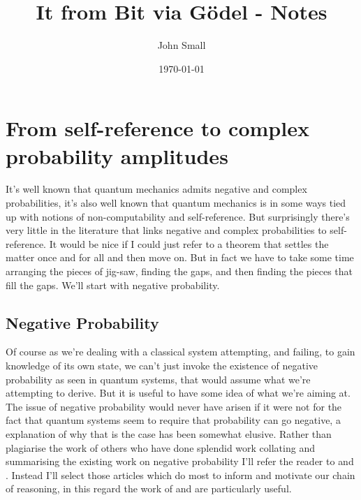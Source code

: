 \documentclass{article}
\title{It from Bit via G\"odel - Notes}
\author{ John Small
}
\date{\today}
\begin{document}
\maketitle

\section{From self-reference to complex probability amplitudes}
It's well known that quantum mechanics admits negative and complex probabilities,  it's also well known that quantum mechanics is in some ways tied up with notions of non-computability and self-reference. But surprisingly there's very little in the literature that links negative and complex probabilities to self-reference. It would be nice if I could just refer to a theorem that settles the matter once and for all and then move on. But in fact we have to take some time arranging the pieces of jig-saw, finding the gaps, and then finding the pieces that fill the gaps. We'll start with negative probability.
\subsection{Negative Probability}
Of course as we're dealing with a classical system attempting, and failing, to gain knowledge of its own state, we can't just invoke the existence of negative probability as seen in quantum systems, that would assume what we're attempting to derive. But it is useful to have some idea of what we're aiming at. The issue of negative probability would never have arisen if it were not for the fact that quantum systems seem to require that probability can go negative, a explanation of why that is the case has been somewhat elusive. Rather than plagiarise the work of others who have done splendid work collating and summarising the existing work on negative probability I'll refer the reader to \autocite{burgin_2009, burgin2010interpretations} and \autocite{muckenheim_1986}. Instead I'll select those articles which do most to inform and motivate our chain of reasoning, in this regard the work of \autocite{burgin2010interpretations} and \autocite{aaronson_lect9,Aaronson:dem} are particularly useful. 
\end{document}
